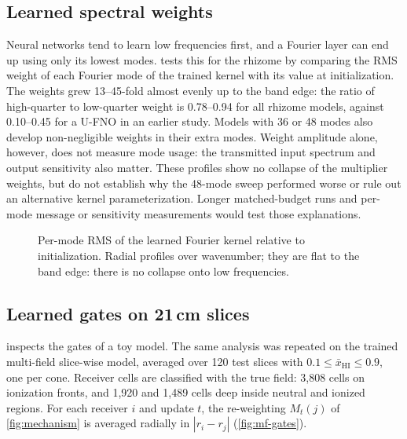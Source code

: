 \subsection{Learned spectral weights}
\label{sec:results-modes}

Neural networks tend to learn low frequencies first, and a Fourier layer can end up using only its lowest modes.  tests this for the rhizome by comparing the RMS weight of each Fourier mode of the trained kernel with its value at initialization. The weights grew 13--45-fold almost evenly up to the band edge: the ratio of high-quarter to low-quarter weight is 0.78--0.94 for all rhizome models, against 0.10--0.45 for a U-FNO in an earlier study. Models with 36 or 48 modes also develop non-negligible weights in their extra modes. Weight amplitude alone, however, does not measure mode usage: the transmitted input spectrum and output sensitivity also matter. These profiles show no collapse of the multiplier weights, but do not establish why the 48-mode sweep performed worse or rule out an alternative kernel parameterization. Longer matched-budget runs and per-mode message or sensitivity measurements would test those explanations.

\begin{figure}[!tp]
  \centering
  \caption{Per-mode RMS of the learned Fourier kernel relative to initialization. Radial profiles over wavenumber; they are flat to the band edge: there is no collapse onto low frequencies.}
  \label{fig:mode-weights}
\end{figure}

\subsection{Learned gates on 21\,cm slices}
\label{sec:results-gates}

 inspects the gates of a toy model. The same analysis was repeated on the trained multi-field slice-wise model, averaged over 120 test slices with $0.1\le\bar x_{\mathrm{HI}}\le0.9$, one per cone. Receiver cells are classified with the true field: 3,808 cells on ionization fronts, and 1,920 and 1,489 cells deep inside neutral and ionized regions. For each receiver $i$ and update $t$, the re-weighting $M_t(j)$ of \cref{fig:mechanism} is averaged radially in $|r_i-r_j|$ (\cref{fig:mf-gates}).

